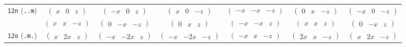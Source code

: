 \documentclass[fleqn,9pt,landscape]{jsarticle}
\begin{document}
\begin{center}
\begin{longtable}{ccccccc}
{\tt 12n} ({\tt ..m}) & $ \begin{pmatrix} x & 0 & z \end{pmatrix} $ & $ \begin{pmatrix} - x & 0 & z \end{pmatrix} $ & $ \begin{pmatrix} x & 0 & - z \end{pmatrix} $ & $ \begin{pmatrix} - x & - x & - z \end{pmatrix} $ & $ \begin{pmatrix} 0 & x & - z \end{pmatrix} $ & $ \begin{pmatrix} - x & 0 & - z \end{pmatrix} $ \\
& $ \begin{pmatrix} x & x & - z \end{pmatrix} $ & $ \begin{pmatrix} 0 & - x & - z \end{pmatrix} $ & $ \begin{pmatrix} 0 & x & z \end{pmatrix} $ & $ \begin{pmatrix} - x & - x & z \end{pmatrix} $ & $ \begin{pmatrix} x & x & z \end{pmatrix} $ & $ \begin{pmatrix} 0 & - x & z \end{pmatrix} $ \\ \hline
{\tt 12o} ({\tt .m.}) & $ \begin{pmatrix} x & 2 x & z \end{pmatrix} $ & $ \begin{pmatrix} - x & - 2 x & z \end{pmatrix} $ & $ \begin{pmatrix} - x & - 2 x & - z \end{pmatrix} $ & $ \begin{pmatrix} - x & x & - z \end{pmatrix} $ & $ \begin{pmatrix} 2 x & x & - z \end{pmatrix} $ & $ \begin{pmatrix} x & 2 x & - z \end{pmatrix} $ \\

\end{longtable}
\end{center}
\end{document}
